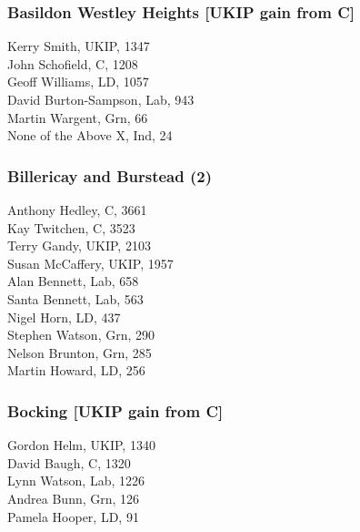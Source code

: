 \documentclass[a4paper,openany,10pt]{book}
\begin{document}
\subsubsection*{Basildon Westley Heights \hspace*{\fill}\nolinebreak[1]%
\enspace\hspace*{\fill}
[UKIP gain from C]}



Kerry Smith, UKIP, 1347\\
John Schofield, C, 1208\\
Geoff Williams, LD, 1057\\
{David Burton-Sampson}, Lab, 943\\
Martin Wargent, Grn, 66\\
None of the Above X, Ind, 24\\


\subsubsection*{Billericay and Burstead (2)}



Anthony Hedley, C, 3661\\
Kay Twitchen, C, 3523\\
Terry Gandy, UKIP, 2103\\
Susan McCaffery, UKIP, 1957\\
Alan Bennett, Lab, 658\\
Santa Bennett, Lab, 563\\
Nigel Horn, LD, 437\\
Stephen Watson, Grn, 290\\
Nelson Brunton, Grn, 285\\
Martin Howard, LD, 256\\


\subsubsection*{Bocking \hspace*{\fill}\nolinebreak[1]%
\enspace\hspace*{\fill}
[UKIP gain from C]}



Gordon Helm, UKIP, 1340\\
David Baugh, C, 1320\\
Lynn Watson, Lab, 1226\\
Andrea Bunn, Grn, 126\\
Pamela Hooper, LD, 91\\
\end{document}
